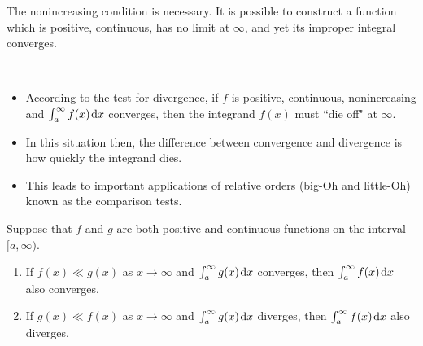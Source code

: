 \ifdefined\SOLUTION
{}
\fi

\vfill

\begin{remark}
The nonincreasing condition is necessary.
It is possible to construct a function which is positive, continuous, has no limit at $\infty$, and yet its improper integral converges.
\end{remark}


\newpage


\begin{remark}\,
\begin{itemize}
\item According to the test for divergence, 
if $f$ is positive, continuous, nonincreasing and $\int_a^\infty f(x)\mkern 2mu \mathrm{d} x$ converges, then the integrand $f(x)$ must ``die off" at $\infty$.
\item In this situation then, the difference between convergence and divergence is how quickly the integrand dies.
\item This leads to important applications of relative orders (big-Oh and little-Oh) known as the comparison tests.
\end{itemize}
\end{remark}

\begin{theorem}
Suppose that $f$ and $g$ are both positive and continuous functions on the interval $[a,\infty)$.
\begin{enumerate}
\item If $f(x)\ll g(x)$ as $x\to\infty$ and $\int_a^\infty g(x)\mkern 2mu \mathrm{d} x$ converges, then $\int_a^\infty f(x)\mkern 2mu \mathrm{d} x$ also converges.
\item If $g(x)\ll f(x)$ as $x\to\infty$ and $\int_a^\infty g(x)\mkern 2mu \mathrm{d} x$ diverges, then $\int_a^\infty f(x)\mkern 2mu \mathrm{d} x$ also diverges.
\end{enumerate}
\end{theorem}

